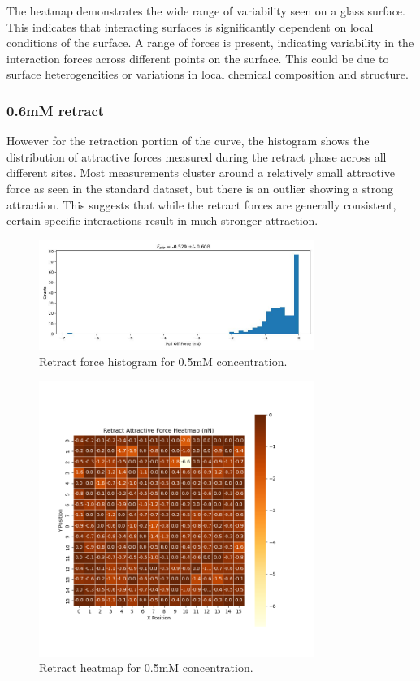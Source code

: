 The heatmap demonstrates the wide range of variability seen on a glass surface. This indicates that interacting surfaces is significantly dependent on local conditions of the surface. A range of forces is present, indicating variability in the interaction forces across different points on the surface. This could be due to surface heterogeneities or variations in local chemical composition and structure. 
\newpage

\subsubsection{0.6mM retract}

However for the retraction portion of the curve, the histogram shows the distribution of attractive forces measured during the retract phase across all different sites. Most measurements cluster around a relatively small attractive force as seen in the standard dataset, but there is an outlier showing a strong attraction. This suggests that while the retract forces are generally consistent, certain specific interactions result in much stronger attraction. 

\begin{figure}[h!!!]
    \centering
    \includegraphics[width=0.8\textwidth]{chapter7/ForceMaps/0.5mM/retract_f_a_hist.jpg}
    \caption{Retract force histogram for 0.5mM concentration.}
    \label{fig:retract_f_a_hist_0.5mM}
\end{figure}

\begin{figure}[h!!!]
    \centering
    \includegraphics[width=0.8\textwidth]{chapter7/ForceMaps/0.5mM/Retract heatmap.png}
    \caption{Retract heatmap for 0.5mM concentration.}
    \label{fig:retract_heatmap_0.5mM}
\end{figure}

